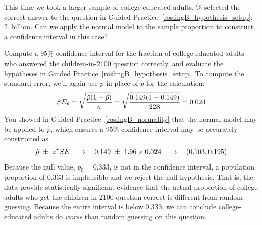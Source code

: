 \begin{exercisewrap}
\begin{nexercise}\label{roslingB_normality}
This time we took a larger sample of
\roslingBsize{} college-educated adults,
\roslingBpercent{}\% selected the correct answer to the
question in Guided
Practice~\ref{roslingB_hypothesis_setup}: 2~billion.
Can we apply the normal model to the sample proportion
to construct a confidence interval in this
case?\footnotemark
\end{nexercise}
\end{exercisewrap}

\begin{examplewrap}
\begin{nexample}{Compute a 95\% confidence interval for the
    fraction of college-educated adults who answered the
    children-in-2100 question correctly, and evaluate the
    hypotheses in Guided
    Practice~\ref{roslingB_hypothesis_setup}.}
  To compute the standard error, we'll again use $\hat{p}$
  in place of $p$ for the calculation:
  \begin{align*}
  SE_{\hat{p}}
      = \sqrt{\frac{\hat{p}(1 - \hat{p})}{n}}
      = \sqrt{\frac{0.149{}(1 - 0.149{})}
          {228{}}}
      = 0.024{}
  \end{align*}
  You showed in Guided Practice~\ref{roslingB_normality}
  that the normal model may be applied to $\hat{p}$,
  which ensures a 95\% confidence interval may be accurately
  constructed as
  \begin{align*}
  \hat{p}~\pm~z^{\star}SE
  \quad\to\quad
  0.149{}~\pm~1.96 \times 0.024{}
  \quad\to\quad
  (0.103, 0.195)
  \end{align*}
  Because the null value, $p_0 = 0.333$, is not in the
  confidence interval, a population proportion of 0.333
  is implausible and we reject the null hypothesis.
  That is, the data provide statistically significant
  evidence that the actual proportion of college adults
  who get the children-in-2100 question correct is
  different from random guessing. Because the entire interval
  is below 0.333, we can conclude college-educated adults
  do \emph{worse} than random guessing on this question.
\end{nexample}
\end{examplewrap}

